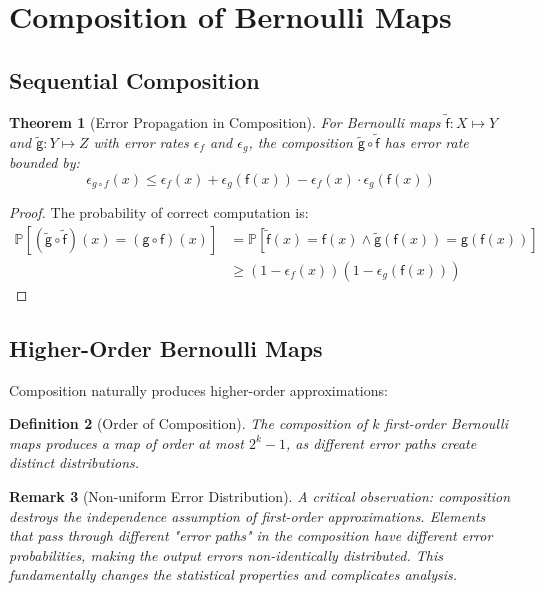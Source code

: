 \documentclass[11pt,final,hidelinks]{article}
\newtheorem{theorem}{Theorem}[section]
\newtheorem{definition}[theorem]{Definition}
\newtheorem{remark}[theorem]{Remark}
\newcommand{\obs}[1]{\widetilde{#1}}  %
\newcommand{\Fun}[1]{\mathsf{#1}}     %
\newcommand{\AFun}[1]{\obs{\mathsf{#1}}}  %
\newcommand{\Set}[1]{#1}              %
\newcommand{\Prob}[1]{\mathbb{P}\left[#1\right]}
\newcommand{\error}{\epsilon}
\newcommand{\compose}{\circ}
\begin{document}
\section{Composition of Bernoulli Maps}

\subsection{Sequential Composition}

\begin{theorem}[Error Propagation in Composition]
For Bernoulli maps $\AFun{f} : \Set{X} \mapsto \Set{Y}$ and $\AFun{g} : \Set{Y} \mapsto \Set{Z}$ with error rates $\error_f$ and $\error_g$, the composition $\AFun{g} \compose \AFun{f}$ has error rate bounded by:
\begin{equation}
\error_{g \compose f}(x) \leq \error_f(x) + \error_g(\Fun{f}(x)) - \error_f(x) \cdot \error_g(\Fun{f}(x))
\end{equation}
\end{theorem}

\begin{proof}
The probability of correct computation is:
\begin{align}
\Prob{(\AFun{g} \compose \AFun{f})(x) = (\Fun{g} \compose \Fun{f})(x)} &= \Prob{\AFun{f}(x) = \Fun{f}(x) \land \AFun{g}(\Fun{f}(x)) = \Fun{g}(\Fun{f}(x))} \\
&\geq (1 - \error_f(x))(1 - \error_g(\Fun{f}(x)))
\end{align}
\end{proof}

\subsection{Higher-Order Bernoulli Maps}

Composition naturally produces higher-order approximations:

\begin{definition}[Order of Composition]
The composition of $k$ first-order Bernoulli maps produces a map of order at most $2^k - 1$, as different error paths create distinct distributions.
\end{definition}

\begin{remark}[Non-uniform Error Distribution]
A critical observation: composition destroys the independence assumption of first-order approximations. Elements that pass through different "error paths" in the composition have different error probabilities, making the output errors non-identically distributed. This fundamentally changes the statistical properties and complicates analysis.
\end{remark}
\end{document}
